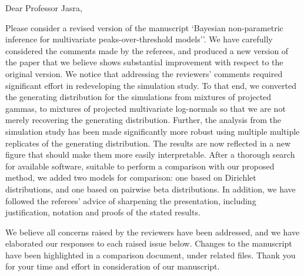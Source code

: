 \documentclass[10pt]{article}
\begin{document}
Dear Professor Jasra,

\vskip 1.5cm

Please consider a revised version of the manuscript `Bayesian non-parametric inference for 
multivariate peaks-over-threshold models''. We have carefully considered the comments made
by the referees, and produced a new version of the paper that we believe shows substantial
improvement with respect to the original version. We notice that addressing the reviewers' 
comments required significant
    effort in redeveloping the simulation study.  To that end, we converted the generating distribution
    for the simulations from mixtures of projected gammas, to mixtures of projected multivariate 
    log-normals so that we are not merely recovering the generating distribution.  Further, the analysis 
    from the simulation study has been made significantly more robust using multiple 
    multiple replicates of the generating distribution.  The results are now reflected in a new figure
    that should make them more easily interpretable.  After a thorough search for available software,
    suitable to perform a comparison with our proposed method, we added two models for 
    comparison: one based on Dirichlet distributions, and one based on pairwise beta distributions.  In
    addition, we have followed the referees' advice of sharpening the presentation, including
    justification, notation and proofs of the stated results.

We believe all concerns raised by the reviewers have been addressed, and we have elaborated our responses
    to each raised issue below.  Changes to the manuscript have been highlighted in a comparison document, under related files.  Thank you for your time and effort in consideration of our manuscript.





    
\end{document}
